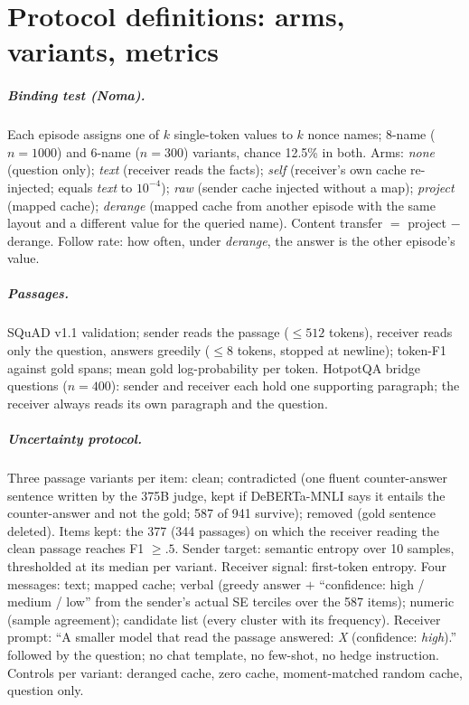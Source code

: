 \documentclass[11pt,a4paper]{report}
\begin{document}
\chapter{Protocol definitions: arms, variants, metrics}
\label{app:protocol}

\paragraph{Binding test (Noma).} Each episode assigns one of $k$ single-token values to $k$ nonce names; 8-name ($n = 1000$) and 6-name ($n = 300$) variants, chance 12.5\% in both. Arms: \emph{none} (question only); \emph{text} (receiver reads the facts); \emph{self} (receiver's own cache re-injected; equals \emph{text} to $10^{-4}$); \emph{raw} (sender cache injected without a map); \emph{project} (mapped cache); \emph{derange} (mapped cache from another episode with the same layout and a different value for the queried name). Content transfer $=$ project $-$ derange. Follow rate: how often, under \emph{derange}, the answer is the other episode's value.

\paragraph{Passages.} SQuAD v1.1 validation; sender reads the passage ($\le 512$ tokens), receiver reads only the question, answers greedily ($\le 8$ tokens, stopped at newline); token-F1 against gold spans; mean gold log-probability per token. HotpotQA bridge questions ($n = 400$): sender and receiver each hold one supporting paragraph; the receiver always reads its own paragraph and the question.

\paragraph{Uncertainty protocol.} Three passage variants per item: clean; contradicted (one fluent counter-answer sentence written by the 375B judge, kept if DeBERTa-MNLI says it entails the counter-answer and not the gold; 587 of 941 survive); removed (gold sentence deleted). Items kept: the 377 (344 passages) on which the receiver reading the clean passage reaches F1 $\ge .5$. Sender target: semantic entropy over 10 samples, thresholded at its median per variant. Receiver signal: first-token entropy. Four messages: text; mapped cache; verbal (greedy answer $+$ ``confidence: high / medium / low'' from the sender's actual SE terciles over the 587 items); numeric (sample agreement); candidate list (every cluster with its frequency). Receiver prompt: ``A smaller model that read the passage answered: \emph{X} (confidence: \emph{high}).'' followed by the question; no chat template, no few-shot, no hedge instruction. Controls per variant: deranged cache, zero cache, moment-matched random cache, question only.
\end{document}
